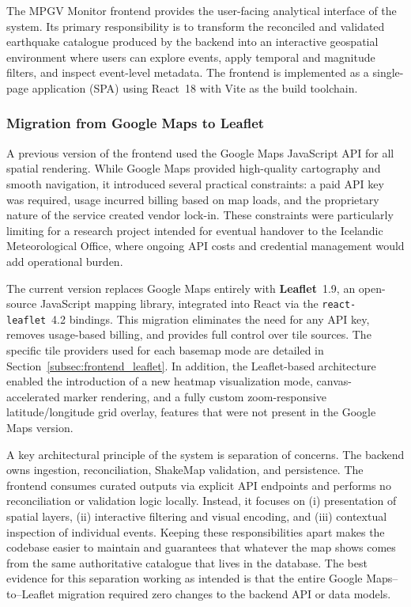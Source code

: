 \documentclass[12pt]{article}
\begin{document}
The MPGV Monitor frontend provides the user-facing analytical interface of the system. Its primary responsibility is to transform the reconciled and validated earthquake catalogue produced by the backend into an interactive geospatial environment where users can explore events, apply temporal and magnitude filters, and inspect event-level metadata. The frontend is implemented as a single-page application (SPA) using React~18 with Vite as the build toolchain.

\subsubsection*{Migration from Google Maps to Leaflet}

A previous version of the frontend used the Google Maps JavaScript API for all spatial rendering. While Google Maps provided high-quality cartography and smooth navigation, it introduced several practical constraints: a paid API key was required, usage incurred billing based on map loads, and the proprietary nature of the service created vendor lock-in. These constraints were particularly limiting for a research project intended for eventual handover to the Icelandic Meteorological Office, where ongoing API costs and credential management would add operational burden.

The current version replaces Google Maps entirely with \textbf{Leaflet}~1.9, an open-source JavaScript mapping library, integrated into React via the \texttt{react-leaflet}~4.2 bindings. This migration eliminates the need for any API key, removes usage-based billing, and provides full control over tile sources. The specific tile providers used for each basemap mode are detailed in Section~\ref{subsec:frontend_leaflet}. In addition, the Leaflet-based architecture enabled the introduction of a new heatmap visualization mode, canvas-accelerated marker rendering, and a fully custom zoom-responsive latitude/longitude grid overlay, features that were not present in the Google Maps version.

A key architectural principle of the system is separation of concerns. The backend owns ingestion, reconciliation, ShakeMap validation, and persistence. The frontend consumes curated outputs via explicit API endpoints and performs no reconciliation or validation logic locally. Instead, it focuses on (i) presentation of spatial layers, (ii) interactive filtering and visual encoding, and (iii) contextual inspection of individual events. Keeping these responsibilities apart makes the codebase easier to maintain and guarantees that whatever the map shows comes from the same authoritative catalogue that lives in the database. The best evidence for this separation working as intended is that the entire Google Maps--to--Leaflet migration required zero changes to the backend API or data models.
\end{document}
